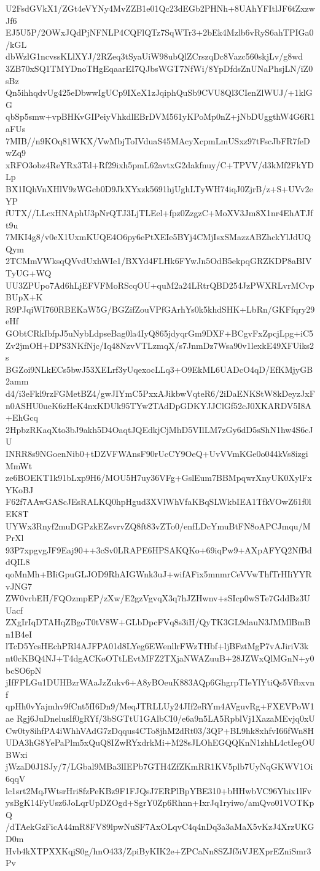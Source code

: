 U2FsdGVkX1/ZGt4eVYNy4MvZZB1e01Qc23dEGb2PHNh+8UAhYFItlJF6tZxzwJf6
EJ5U5P/2OWxJQdPjNFNLP4CQFlQTz7SqWTr3+2bEk4Mzlb6vRyS6ahTPIGa0/kGL
dbWzlG1ncvssKLlXYJ/2RZeq3tSyaUiW98ubQlZCrszqDc8Vazc560skjLv/g8wd
3ZB70xSQ1TMYDnoTHgEqaarEI7QJbsWGT7NfWi/8YpDfdsZnUNaPhsjLN/iZ0sBz
Qn5ihhqdvUg425eDbwwIgUCp9IXeX1zJqiphQuSb9CVU8Ql3CIenZlWUJ/+1klGG
qbSp5smw+vpBHKvGIPeiyVhkdlEBrDVM561yKPoMp0nZ+jNbDUggthW4G6R1aFUs
7MIB//n9KOq81WKX/VwMbjToIVduaS45MAcyXcpmLmUSxz97tFscJbFR7feDwZq9
xRFO3obz4ReYRx3Td+Rf29ixh5pmL62avtxG2dakfnuy/C+TPVV/d3kMf2FkYDLp
BX1IQhVnXHlV9zWGcb0D9JkXYxzk5691hjUghLTyWH74iqJ0ZjrB/z+S+UVv2eYP
fUTX//LLcxHNAphU3pNrQTJ3LjTLEel+fpz0ZzgzC+MoXV3Jm8X1nr4EhATJft9u
7MKI4g8/v0eX1UxmKUQE4O6py6ePtXEIe5BYj4CMjIsxSMazzABZhckYlJdUQQym
2TCMmVWksqQVvdUxhWIe1/BXYd4FLHk6FYwJn5OdB5ekpqGRZKDP8aBIVTyUG+WQ
UU3ZPUpo7Ad6hLjEFVFMoRScqOU+quM2a24LRtrQBD254JzPWXRLvrMCvpBUpX+K
R9PJqiWI760RBEKaW5G/BGZifZouVPfGArhYs0k5khdSHK+LbRn/GKFfqry29eHf
GObtCRkIbfpJ5uNybLdpseBag0la4IyQ865jdyqrGm9DXF+BCgvFxZpcjLpg+iC5
Zv2jmOH+DPS3NKfNjc/Iq48NzvVTLzmqX/s7JnmDz7Wsa90v1lexkE49XFUiks2s
BGZoi9NLkECs5bwJ53XELrf3yUqexocLLq3+O9EkML6UADcO4qD/EfKMjyGB2amm
d4/i3eFkl9rzFGMetBZ4/gwJIYmC5PxxAJikbwVqteR6/2iDaENKStW8kDeyzJxF
n0ASHU0ueK6zHeK4nxKDUk95TYw2TAdDpGDKYJJClGf52cJ0XKARDV5I8A+EhGcq
2HpbzRKaqXto3bJ9akh5D4OaqtJQEdkjCjMhD5VIlLM7zGy6dD5sShN1hw4S6cJU
INRR8s9NGoenNib0+tDZVFWAnsF90rUcCY9OeQ+UvVVmKGe0o044kVs8izgiMmWt
ze6BOEKT1k91bLxp9H6/MOU5H7uy36VFg+GslEum7BBMpqwrXnyUK0XylFxYKoBJ
F62f7AAwGAScJEsRALKQ0hpHgud3XVlWhVfaKBqSLWkbIEA1TfkVOwZ61f0lEK8T
UYWx3Rnyf2muDGPzkEZsvrvZQ8ft83vZTo0/enfLDcYmuBtFN8oAPCJmqu/MPrXl
93P7xpgvgJF9Eaj90++3cSv0LRAPE6HPSAKQKo+69iqPw9+AXpAFYQ2NfBddQIL8
qoMnMh+BIiGpuGLJOD9RhAIGWnk3uJ+wifAFix5mnmrCeVVwThfTrHIiYYRvJNG7
ZW0vrbEH/FQOzmpEP/zXw/E2gzVgvqX3q7hJZHwnv+sSIcp0wSTe7GddBz3UUacf
ZXgIrIqDTAHqZBgoT0tV8W+GLbDpcFVq8s3iH/QyTK3GL9dauN3JMMlBmBn1B4eI
lTcD5YcsHEchPRl4AJFPA01d8LYeg6EWenllrFWzTHbf+ljBFztMgP7vAJiriV3k
nt0cKBQ4NJ+T4dgACKoOTtLEvtMFZ2TXjaNWAZuuB+28JZWxQlMGnN+y0bcSO6pN
jIfFPLGu1DUHBzrWAaJzZukv6+A8yBOeuK883AQp6GhgrpTIeYlYtiQs5Vfbxvnf
qpHh0vYajmhv9fCnt5fI6Dn9/MeqJTRLLUy24JIf2eRYm4AVguvRg+FXEVPoW1ae
Rgj6JuDnelusIf0gRYf/3bSGTtU1GAlbCI0/e6a9n5LA5RpblVj1XazaMEvjq0xU
Cw0ty8ihfPA4iWhhVAdG7zDqqus4CTo8jhM2dRt03/3QP+BL9hk8xhfvI66fWn8H
UDA3hG8YePaPlm5xQuQ8IZwRYxdrkMi+M28sJLOhEGQQKnN1zhhL4ctIegOUBWxi
jWzaD0J1SJy/7/LGbal9MBa3lIEPb7GTH4ZfZKmRR1KV5plb7UyNqGKWV1Oi6qqV
lc1srt2MqJWtsrHri8fzPeKBz9F1FJQsJ7ERPlBpYBE310+bHHwbVC96Yhix1lFv
ysBgK14FyUsz6JoLqrUpDZOgd+SgrY0Zp6Rhnn+IxrJq1ryiwo/amQvo01VOTKpQ
/dTAekGzFicA44mR8FV89lpwNuSF7AxOLqvC4q4nDq3a3aMaX5vKzJ4XrzUKGD0m
Hvb4kXTPXXKqjS0g/hnO433/ZpiByKIK2e+ZPCaNn8SZJf5iVJEXprEZniSmr3Pv

